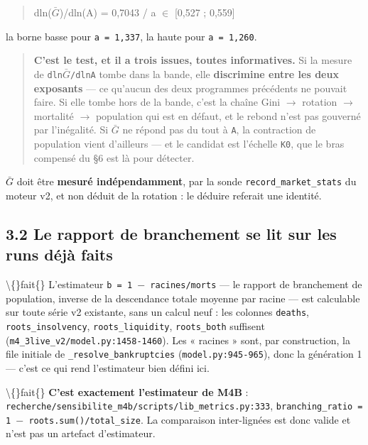 \documentclass[11pt,a4paper]{article}
\newcommand{\code}[1]{\texttt{#1}}
\begin{document}
\begin{quote}\ttfamily\footnotesize\obeylines
dln(\ensuremath{\bar{G}})/dln(A)  =  0,7043 / a  \ensuremath{\in}  [0,527 ; 0,559]
\end{quote}

la borne basse pour \code{a = 1,337}, la haute pour \code{a = 1,260}.

\begin{quote}
\textbf{C'est le test, et il a trois issues, toutes informatives.} Si la mesure de \code{dln\ensuremath{\bar{G}}/dlnA} tombe dans la bande, elle \textbf{discrimine entre les deux exposants} --- ce qu'aucun des deux programmes précédents ne pouvait faire. Si elle tombe hors de la bande, c'est la chaîne Gini \ensuremath{\rightarrow} rotation \ensuremath{\rightarrow} mortalité \ensuremath{\rightarrow} population qui est en défaut, et le rebond n'est pas gouverné par l'inégalité. Si \ensuremath{\bar{G}} ne répond pas du tout à \code{A}, la contraction de population vient d'ailleurs --- et le candidat est l'échelle \code{K0}, que le bras compensé du §6 est là pour détecter.
\end{quote}

\ensuremath{\bar{G}} doit être \textbf{mesuré indépendamment}, par la sonde \code{record\_market\_stats} du moteur v2, et non déduit de la rotation : le déduire referait une identité.

\subsection*{3.2 Le rapport de branchement se lit sur les runs déjà faits}

\textbackslash\{\}fait\{\} L'estimateur \code{b = 1 \ensuremath{-} racines/morts} --- le rapport de branchement de population, inverse de la descendance totale moyenne par racine --- est calculable sur toute série v2 existante, sans un calcul neuf : les colonnes \code{deaths}, \code{roots\_insolvency}, \code{roots\_liquidity}, \code{roots\_both} suffisent (\code{m4\_3live\_v2/model.py:1458-1460}). Les « racines » sont, par construction, la file initiale de \code{\_resolve\_bankruptcies} (\code{model.py:945-965}), donc la génération 1 --- c'est ce qui rend l'estimateur bien défini ici.

\textbackslash\{\}fait\{\} \textbf{C'est exactement l'estimateur de M4B} : \code{recherche/sensibilite\_m4b/scripts/lib\_metrics.py:333}, \code{branching\_ratio = 1 \ensuremath{-} roots.sum()/total\_size}. La comparaison inter-lignées est donc valide et n'est pas un artefact d'estimateur.
\end{document}

